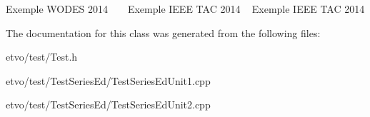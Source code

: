 Exemple W\+O\+D\+ES 2014 ~\newline
~\newline
 Exemple I\+E\+EE T\+AC 2014 ~\newline
 Exemple I\+E\+EE T\+AC 2014 

The documentation for this class was generated from the following files\+:\begin{DoxyCompactItemize}
\item 
etvo/test/Test.\+h\item 
etvo/test/\+Test\+Series\+Ed/Test\+Series\+Ed\+Unit1.\+cpp\item 
etvo/test/\+Test\+Series\+Ed/Test\+Series\+Ed\+Unit2.\+cpp\end{DoxyCompactItemize}

